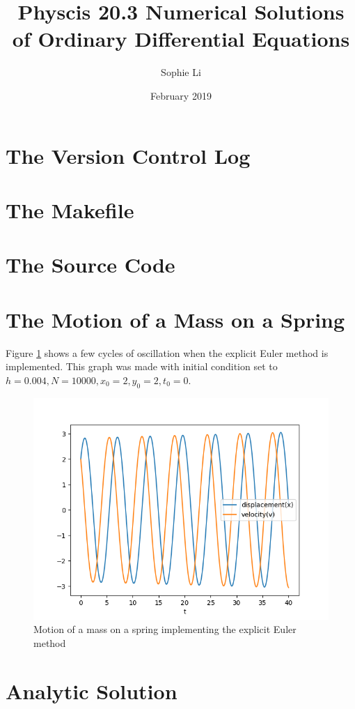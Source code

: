 \documentclass{article}
\title{Physcis 20.3 Numerical Solutions of Ordinary Differential Equations}
\author{Sophie Li}
\date{February 2019}
\begin{document}
\maketitle

\section{The Version Control Log}

\section{The Makefile}

\section{The Source Code}

\section{The Motion of a Mass on a Spring}
Figure \ref{fig:expliciteuler} shows a few cycles of oscillation when the explicit Euler method is implemented. This graph was made with initial condition set to $h=0.004, N=10000, x_0=2, y_0=2, t_0=0$.
\begin{figure}[h]
    \centering
    \includegraphics[width = \textwidth]{Images/expliciteuler.png}
    \caption{Motion of a mass on a spring implementing the explicit Euler method}
    \label{fig:expliciteuler}
\end{figure}

\section{Analytic Solution}
\end{document}
